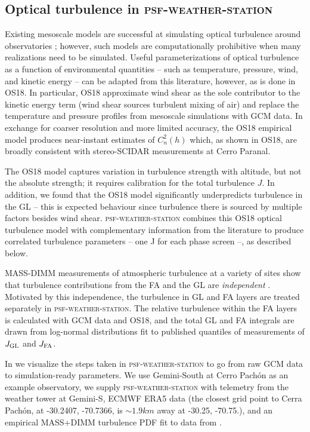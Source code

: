 \documentclass[twocolumn]{aastex631}
\newcommand{\psfws}{\textsc{psf-weather-station}\xspace}
\newcommand{\osborn}{OS18\xspace}
\begin{document}
\subsection{Optical turbulence in \psfws}
Existing mesoscale models are successful at simulating optical turbulence around observatories \citep{masciadri_improvements_2001, masciadri_optical_2017}; however, such models are computationally prohibitive when many realizations need to be simulated. 
Useful parameterizations of optical turbulence as a function of environmental quantities -- such as temperature, pressure, wind, and kinetic energy -- can be adapted from this literature, however, as is done in \osborn.
In particular, \osborn approximate wind shear as the sole contributor to the kinetic energy term (\ie wind shear sources turbulent mixing of air) and replace the temperature and pressure profiles from mesoscale simulations with GCM data.
In exchange for coarser resolution and more limited accuracy, the \osborn empirical model produces near-instant estimates of $C_n^2(h)$ which, as shown in \osborn, are broadly consistent with stereo-SCIDAR measurements at Cerro Paranal. 

The \osborn model captures variation in turbulence strength with altitude, but not the absolute strength; it requires calibration for the total turbulence $J$.
In addition, we found that the \osborn model significantly underpredicts turbulence in the GL -- this is expected behaviour since turbulence there is sourced by multiple factors besides wind shear.
\psfws combines this \osborn optical turbulence model with complementary information from the literature to produce correlated turbulence parameters -- one J for each phase screen --, as described below.

MASS-DIMM measurements of atmospheric turbulence at a variety of sites show that turbulence contributions from the FA and the GL are \textit{independent} \citep{tokovinin_model_2005, tokovinin_optical_2005, chun_mauna_2009}.
Motivated by this independence, the turbulence in GL and FA layers are treated separately in \psfws.
The relative turbulence within the FA layers is calculated with GCM data and \osborn, and the total GL and FA integrals are drawn from log-normal distributions fit to published quantiles of measurements of $J_{\rm GL}$ and $J_{\rm FA}$.

In  we visualize the steps taken in \psfws to go from raw GCM data to simulation-ready parameters.
We use Gemini-South at Cerro Pachón as an example observatory,
\ie we supply \psfws with telemetry from the weather tower at Gemini-S, ECMWF ERA5 data (the closest grid point to Cerra Pachón, at -30.2407, -70.7366, is $\sim 1.9\unit{km}$ away at -30.25, -70.75.), and an empirical MASS+DIMM turbulence PDF fit to data from \citep{tokovinin_model_2005}. 
\end{document}

